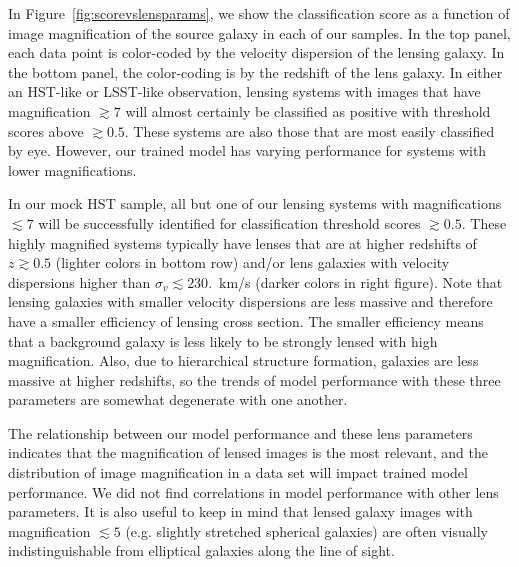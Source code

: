 \documentclass{emulateapj}
\def\gsim{\gtrsim}
\def\lsim{\lesssim}
\begin{document}
In Figure~\ref{fig:scorevslensparams}, we show the classification
score as a function of image magnification of the source galaxy in
each of our samples.  In the top panel, each data point is color-coded
by the velocity dispersion of the lensing galaxy.  In the bottom
panel, the color-coding is by the redshift of the lens galaxy.  In
either an HST-like or LSST-like observation, lensing systems with
images that have magnification $\gsim7$ will almost certainly be
classified as positive with threshold scores above $\gsim0.5$.  These
systems are also those that are most easily classified by eye.
However, our trained model has varying performance for systems with
lower magnifications.

In our mock HST sample, all but one of our lensing systems with
magnifications $\lsim7$ will be successfully identified for
classification threshold scores $\gsim0.5$.  These highly magnified
systems typically have lenses that are at higher redshifts of
$z\gsim0.5$ (lighter colors in bottom row) and/or lens galaxies with
velocity dispersions higher than $\sigma_v\lsim230.$~km/s (darker
colors in right figure).  Note that lensing galaxies with smaller
velocity dispersions are less massive and therefore have a smaller
efficiency of lensing cross section.  The smaller efficiency means
that a background galaxy is less likely to be strongly lensed with
high magnification.  Also, due to hierarchical structure formation,
galaxies are less massive at higher redshifts, so the trends of model
performance with these three parameters are somewhat degenerate with
one another.

The relationship between our model performance and these lens
parameters indicates that the magnification of lensed images is the
most relevant, and the distribution of image magnification in a data
set will impact trained model performance.  We did not find
correlations in model performance with other lens parameters.  It is
also useful to keep in mind that lensed galaxy images with
magnification $\lsim5$ (e.g. slightly stretched spherical galaxies)
are often visually indistinguishable from elliptical galaxies along
the line of sight.  
\end{document}
